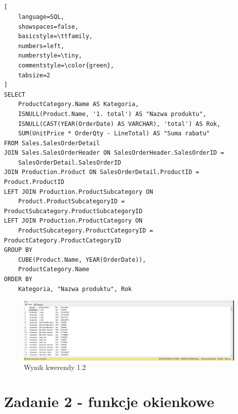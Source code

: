 \documentclass[a4paper,12pt]{article}
\begin{document}
\subsection{}

{\small
\begin{lstlisting}[
	language=SQL,
	showspaces=false,
	basicstyle=\ttfamily,
	numbers=left,
	numberstyle=\tiny,
	commentstyle=\color{green},
	tabsize=2
]
SELECT 
    ProductCategory.Name AS Kategoria, 
    ISNULL(Product.Name, '1. total') AS "Nazwa produktu", 
    ISNULL(CAST(YEAR(OrderDate) AS VARCHAR), 'total') AS Rok, 
    SUM(UnitPrice * OrderQty - LineTotal) AS "Suma rabatu" 
FROM Sales.SalesOrderDetail
JOIN Sales.SalesOrderHeader ON SalesOrderHeader.SalesOrderID = 
    SalesOrderDetail.SalesOrderID
JOIN Production.Product ON SalesOrderDetail.ProductID = Product.ProductID
LEFT JOIN Production.ProductSubcategory ON 
    Product.ProductSubcategoryID = ProductSubcategory.ProductSubcategoryID
LEFT JOIN Production.ProductCategory ON 
    ProductSubcategory.ProductCategoryID = ProductCategory.ProductCategoryID
GROUP BY 
    CUBE(Product.Name, YEAR(OrderDate)),
	ProductCategory.Name
ORDER BY 
    Kategoria, "Nazwa produktu", Rok
\end{lstlisting}}

\begin{figure}[H]
  \centering
  \includegraphics[width=1.0\textwidth]{images/1.2.png}
  \caption{Wynik kwerendy 1.2}
\end{figure}

\section{Zadanie 2 - funkcje okienkowe}

\subsection{}
\end{document}
